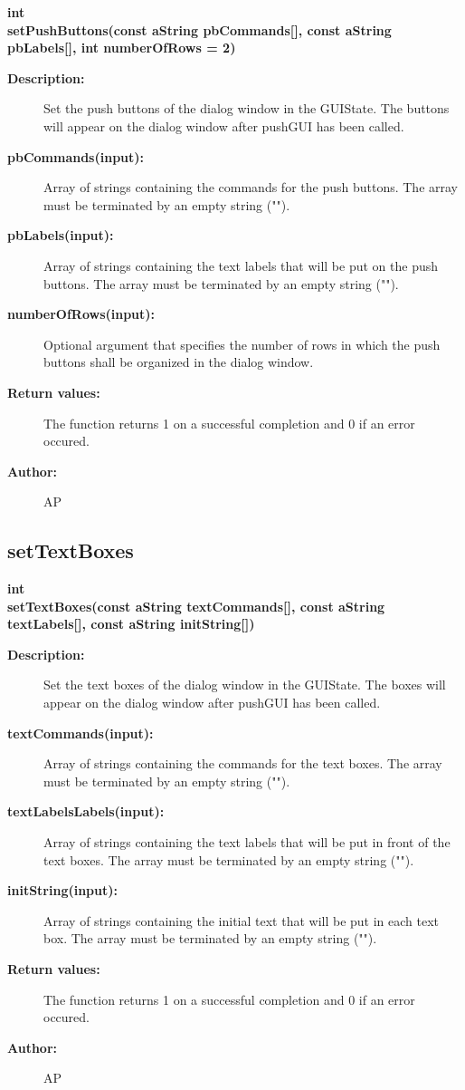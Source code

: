 \begin{flushleft} \textbf{%
int  \\ 
\settowidth{\DialogDataIncludeArgIndent}{setPushButtons(}%
setPushButtons(const aString pbCommands[], const aString pbLabels[], int numberOfRows  = 2)
}\end{flushleft}
\begin{description}
\item[{\bf Description:}]  Set the push buttons of the dialog window in the GUIState. The buttons
 will appear on the dialog window after pushGUI has been called.

\item[{\bf pbCommands(input):}]  Array of strings containing the commands for the push buttons. 
   The array  must be terminated by an empty string ("").
\item[{\bf pbLabels(input):}]  Array of strings containing the text labels that will be put on
   the push buttons. The array must be terminated by an empty string ("").
\item[{\bf numberOfRows(input):}]  Optional argument that specifies the number of rows in which the 
   push buttons shall be organized in the dialog window.

\item[{\bf Return values:}]  The function returns 1 on a successful completion and 0 if an error occured.
\item[{\bf Author:}]  AP
\end{description}
\subsection{setTextBoxes}
 
\begin{flushleft} \textbf{%
int  \\ 
\settowidth{\DialogDataIncludeArgIndent}{setTextBoxes(}%
setTextBoxes(const aString textCommands[], const aString textLabels[], const aString initString[])
}\end{flushleft}
\begin{description}
\item[{\bf Description:}]  Set the text boxes of the dialog window in the GUIState. The boxes
 will appear on the dialog window after pushGUI has been called.

\item[{\bf textCommands(input):}]  Array of strings containing the commands for the text boxes. 
   The array  must be terminated by an empty string ("").
\item[{\bf textLabelsLabels(input):}]  Array of strings containing the text labels that will be put 
   in front of the text boxes. The array must be terminated by an empty string ("").
\item[{\bf initString(input):}]   Array of strings containing the initial text that will be put
   in each text box. The array must be terminated by an empty string ("").

\item[{\bf Return values:}]  The function returns 1 on a successful completion and 0 if an error occured.
\item[{\bf Author:}]  AP
\end{description}
